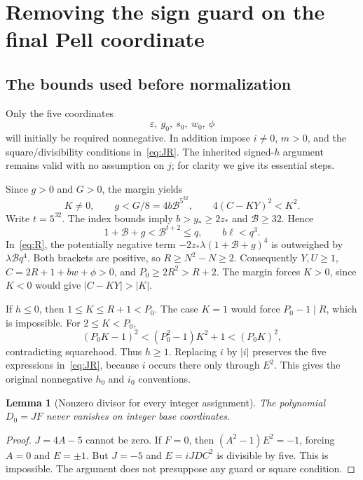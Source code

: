 \documentclass[11pt]{article}
\newtheorem{lemma}[theorem]{Lemma}
\theoremstyle{definition}\newtheorem{definition}[theorem]{Definition}
\begin{document}
\section{Removing the sign guard on the final Pell coordinate}\label{sec:pell}
\subsection{The bounds used before normalization}
Only the five coordinates
\[
 \varepsilon,\ g_0,\ s_0,\ w_0,\ \phi
\]
will initially be required nonnegative. In addition impose $i\ne0$, $m>0$, and the square/divisibility conditions in~\eqref{eq:JR}. The inherited signed-$h$ argument remains valid with no assumption on $j$; for clarity we give its essential steps.

Since $g>0$ and $G>0$, the margin yields
\[
 K\ne0,\qquad g<G/8=4b\mathcal B^{5^{32}},
 \qquad 4(C-KY)^2<K^2.
\]
Write $t=5^{32}$. The index bounds imply $b>y_*\ge2z_*$ and $\mathcal B\ge32$. Hence
\[
 1+\mathcal B+g<\mathcal B^{t+2}\le q,
 \qquad b\ell<q^3.
\]
In~\eqref{eq:R}, the potentially negative term
$-2z_*\lambda(1+\mathcal B+g)^4$ is outweighed by
$\lambda\mathcal Bq^4$. Both brackets are positive, so $R\ge N^2-N\ge2$.
Consequently $Y,U\ge1$, $C=2R+1+bw+\phi>0$, and $P_0\ge2R^2>R+2$.
The margin forces $K>0$, since $K<0$ would give $|C-KY|>|K|$.

If $h\le0$, then $1\le K\le R+1<P_0$. The case $K=1$ would force
$P_0-1\mid R$, which is impossible. For $2\le K<P_0$,
\[
 (P_0K-1)^2<(P_0^2-1)K^2+1<(P_0K)^2,
\]
contradicting squarehood. Thus $h\ge1$. Replacing $i$ by $|i|$ preserves the five expressions in~\eqref{eq:JR}, because $i$ occurs there only through $E^2$. This gives the original nonnegative $h_0$ and $i_0$ conventions.

\begin{lemma}[Nonzero divisor for every integer assignment]\label{lem:denom}
The polynomial $D_0=JF$ never vanishes on integer base coordinates.
\end{lemma}
\begin{proof}
$J=4A-5$ cannot be zero. If $F=0$, then $(A^2-1)E^2=-1$, forcing $A=0$ and $E=\pm1$. But $J=-5$ and $E=iJDC^2$ is divisible by five. This is impossible. The argument does not presuppose any guard or square condition.
\end{proof}
\end{document}
